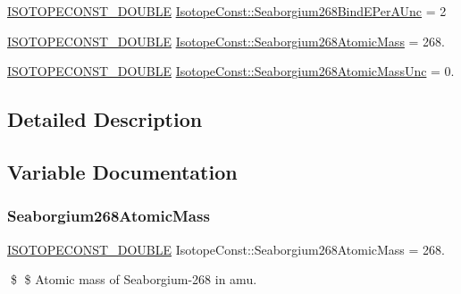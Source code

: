 \begin{DoxyCompactItemize}
\mbox{\hyperlink{group___isotope_const-_macros_ga8f45a7272ce02c0b4c65c44636ed719a}{I\+S\+O\+T\+O\+P\+E\+C\+O\+N\+S\+T\+\_\+\+D\+O\+U\+B\+LE}} \mbox{\hyperlink{group___isotope_const-_seaborgium-_sg268_gac19be87b8fbd197316b3d892ddb2d75c}{Isotope\+Const\+::\+Seaborgium268\+Bind\+E\+Per\+A\+Unc}} = 2
\item 
\mbox{\hyperlink{group___isotope_const-_macros_ga8f45a7272ce02c0b4c65c44636ed719a}{I\+S\+O\+T\+O\+P\+E\+C\+O\+N\+S\+T\+\_\+\+D\+O\+U\+B\+LE}} \mbox{\hyperlink{group___isotope_const-_seaborgium-_sg268_gacfe15f813b6bab10b179928849f48e1b}{Isotope\+Const\+::\+Seaborgium268\+Atomic\+Mass}} = 268.
\item 
\mbox{\hyperlink{group___isotope_const-_macros_ga8f45a7272ce02c0b4c65c44636ed719a}{I\+S\+O\+T\+O\+P\+E\+C\+O\+N\+S\+T\+\_\+\+D\+O\+U\+B\+LE}} \mbox{\hyperlink{group___isotope_const-_seaborgium-_sg268_gaee7478395feb49dd84c3aa1a683128a3}{Isotope\+Const\+::\+Seaborgium268\+Atomic\+Mass\+Unc}} = 0.
\end{DoxyCompactItemize}


\subsection{Detailed Description}


\subsection{Variable Documentation}
\mbox{\label{group___isotope_const-_seaborgium-_sg268_gacfe15f813b6bab10b179928849f48e1b}} 
\subsubsection{\texorpdfstring{Seaborgium268\+Atomic\+Mass}{Seaborgium268AtomicMass}}
{\footnotesize\ttfamily \mbox{\hyperlink{group___isotope_const-_macros_ga8f45a7272ce02c0b4c65c44636ed719a}{I\+S\+O\+T\+O\+P\+E\+C\+O\+N\+S\+T\+\_\+\+D\+O\+U\+B\+LE}} Isotope\+Const\+::\+Seaborgium268\+Atomic\+Mass = 268.}

\$ \$ Atomic mass of Seaborgium-\/268 in amu. \mbox{\label{group___isotope_const-_seaborgium-_sg268_gaee7478395feb49dd84c3aa1a683128a3}} 
